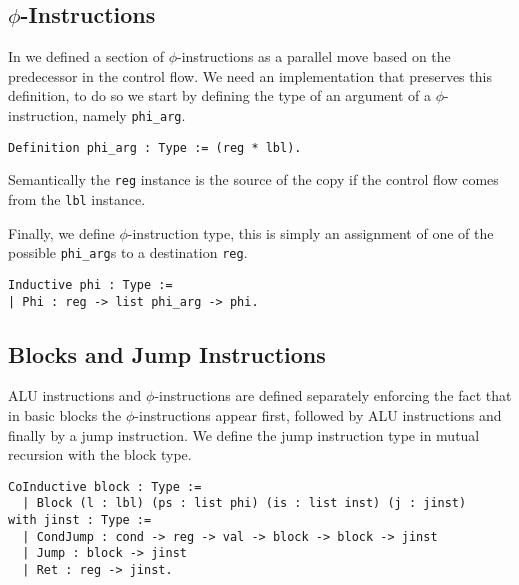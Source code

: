\subsection{$\phi$-Instructions}

In  we defined a section of $\phi$-instructions as a parallel move based on the predecessor in the control flow.
We need an implementation that preserves this definition, to do so we start by defining the type of an argument of a $\phi$-instruction, namely \texttt{phi\_arg}.

\begin{lstlisting}[style=Rocq]
Definition phi_arg : Type := (reg * lbl).
\end{lstlisting}

Semantically the \texttt{reg} instance is the source of the copy if the control flow comes from the \texttt{lbl} instance.

Finally, we define $\phi$-instruction type, this is simply an assignment of one of the possible \texttt{phi\_arg}s to a destination \texttt{reg}.

\begin{lstlisting}[style=Rocq]
Inductive phi : Type :=
| Phi : reg -> list phi_arg -> phi.
\end{lstlisting}


\subsection{Blocks and Jump Instructions}

ALU instructions and $\phi$-instructions are defined separately enforcing the fact that in basic blocks the $\phi$-instructions appear first, followed by ALU instructions and finally by a jump instruction.
We define the jump instruction type in mutual recursion with the block type.

\begin{lstlisting}[style=Rocq]
CoInductive block : Type :=
  | Block (l : lbl) (ps : list phi) (is : list inst) (j : jinst)
with jinst : Type :=
  | CondJump : cond -> reg -> val -> block -> block -> jinst
  | Jump : block -> jinst
  | Ret : reg -> jinst.
\end{lstlisting}

